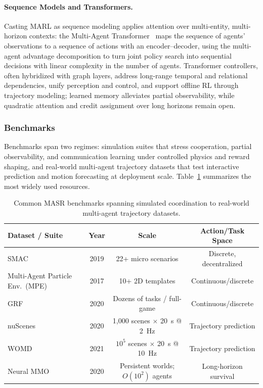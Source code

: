 \paragraph{Sequence Models and Transformers.}
Casting MARL as sequence modeling applies attention over multi-entity, multi-horizon contexts: the Multi-Agent Transformer~\cite{wen2022mat} maps the sequence of agents' observations to a sequence of actions with an encoder--decoder, using the multi-agent advantage decomposition to turn joint policy search into sequential decisions with linear complexity in the number of agents.
Transformer controllers, often hybridized with graph layers, address long-range temporal and relational dependencies, unify perception and control, and support offline RL through trajectory modeling; learned memory alleviates partial observability, while quadratic attention and credit assignment over long horizons remain open.


\subsubsection{Benchmarks}
Benchmarks span two regimes: simulation suites that stress cooperation, partial observability, and communication learning under controlled physics and reward shaping, and real-world multi-agent trajectory datasets that test interactive prediction and motion forecasting at deployment scale.
Table~\ref{tab:MASR_datasets} summarizes the most widely used resources.

\begin{table}[t]
\centering
\caption{Common MASR benchmarks spanning simulated coordination to real-world multi-agent trajectory datasets.}
\label{tab:MASR_datasets}
\fontsize{9}{11}\selectfont
\setlength{\tabcolsep}{3mm}
\begin{tabular}{@{}lccc@{}}
\toprule
\textbf{Dataset / Suite} & \textbf{Year} & \textbf{Scale} & \textbf{Action/Task Space} \\
\midrule
SMAC \cite{samvelyan2019smac} & 2019 &
  22+ micro scenarios & Discrete, decentralized \\
Multi-Agent Particle Env.\ (MPE) \cite{lowe2017maddpg} & 2017 &
  10+ 2D templates & Continuous/discrete \\
GRF \cite{kurach2020grf} & 2020 &
  Dozens of tasks / full-game & Continuous/discrete  \\
nuScenes \cite{caesar2020nuscenes} & 2020 &
  1,000 scenes $\times$ \SI{20}{s} @ \SI{2}{Hz} &
  Trajectory prediction \\
WOMD \cite{ettinger2021womd} & 2021 &
  $10^{5}$ scenes $\times$ \SI{20}{s} @ \SI{10}{Hz} &
  Trajectory prediction \\
Neural MMO \cite{mmo20aamas, MMO23nips} & 2020 &
  Persistent worlds; $O(10^2)$ agents & Long-horizon survival \\
\bottomrule
\end{tabular}
\end{table}

